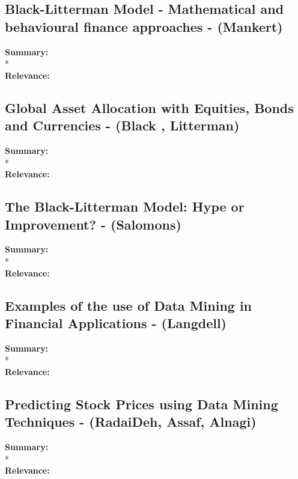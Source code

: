 \documentclass[11pt]{article}
\begin{document}
\subsection{\textnormal{Black-Litterman Model - Mathematical and behavioural finance approaches - (Mankert)}} 

\textbf{Summary: } 
\\*
\\
\textbf{Relevance: } 

\subsection{\textnormal{Global Asset Allocation with Equities, Bonds and Currencies - (Black , Litterman)}} 

\textbf{Summary: } 
\\*
\\
\textbf{Relevance: } 

\subsection{\textnormal{The Black-Litterman Model: Hype or Improvement? - (Salomons)}} 

\textbf{Summary: } 
\\*
\\
\textbf{Relevance: } 

\subsection{\textnormal{Examples of the use of Data Mining in Financial Applications - (Langdell)}} 

\textbf{Summary: } 
\\*
\\
\textbf{Relevance: } 

\subsection{\textnormal{Predicting Stock Prices using Data Mining Techniques - (RadaiDeh, Assaf, Alnagi)}} 

\textbf{Summary: } 
\\*
\\
\textbf{Relevance: } 
\end{document}
